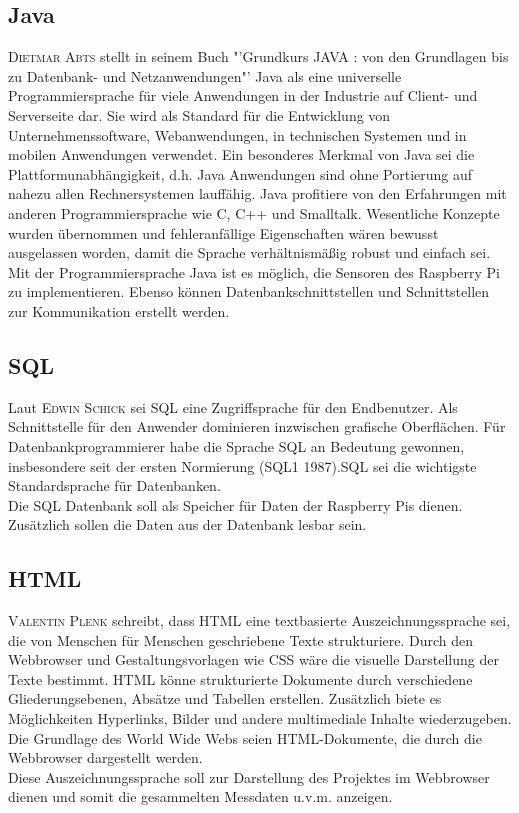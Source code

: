 \subsection{Java}\label{Java}
\textsc{Dietmar Abts} stellt in seinem Buch "'Grundkurs JAVA : von den Grundlagen bis zu Datenbank- und Netzanwendungen"' \cite{abts2015grundkurs} Java als eine universelle Programmiersprache für viele Anwendungen in der Industrie auf Client- und Serverseite dar.
Sie wird als Standard für die Entwicklung von Unternehmenssoftware, Webanwendungen, in technischen Systemen und in mobilen Anwendungen verwendet.
Ein besonderes Merkmal von Java sei die Plattformunabhängigkeit, d.h. Java Anwendungen sind ohne Portierung auf nahezu allen Rechnersystemen lauffähig. Java profitiere von den Erfahrungen mit anderen Programmiersprache wie C, C++ und Smalltalk. Wesentliche Konzepte wurden übernommen und fehleranfällige Eigenschaften wären bewusst ausgelassen worden, damit die Sprache verhältnismäßig robust und einfach sei.\\
Mit der Programmiersprache Java ist es möglich, die Sensoren des Raspberry Pi zu implementieren. Ebenso können Datenbankschnittstellen und Schnittstellen zur Kommunikation erstellt werden.

\subsection{\acf{SQL}}
Laut \textsc{Edwin Schick}\cite{schicker2017datenbanken} sei \ac{SQL} eine Zugriffsprache für den Endbenutzer. Als Schnittstelle für den Anwender dominieren inzwischen grafische Oberflächen. Für Datenbankprogrammierer habe die Sprache \ac{SQL} an Bedeutung gewonnen, insbesondere seit der ersten Normierung (SQL1 1987).\ac{SQL} sei die wichtigste Standardsprache für Datenbanken. \\
Die \ac{SQL} Datenbank soll als Speicher für Daten der Raspberry Pis dienen. Zusätzlich sollen die Daten aus der Datenbank lesbar sein.

\subsection{\acf{HTML}}
\textsc{Valentin Plenk}\cite{plenk2017angewandte} schreibt, dass \ac{HTML} eine textbasierte Auszeichnungssprache sei, die von Menschen für Menschen geschriebene Texte strukturiere. Durch den Webbrowser und Gestaltungsvorlagen wie \ac{CSS} wäre die visuelle Darstellung der Texte bestimmt. \ac{HTML} könne strukturierte Dokumente durch verschiedene Gliederungsebenen, Absätze und Tabellen erstellen. Zusätzlich biete es Möglichkeiten Hyperlinks, Bilder und andere multimediale Inhalte wiederzugeben. Die Grundlage des World Wide Webs seien \ac{HTML}-Dokumente, die durch die Webbrowser dargestellt werden. \\
Diese Auszeichnungssprache soll zur Darstellung des Projektes im Webbrowser dienen und somit die gesammelten Messdaten u.v.m. anzeigen.

